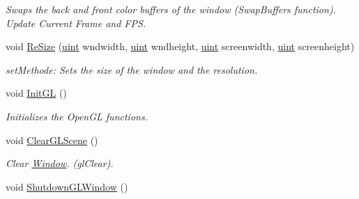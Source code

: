 \begin{DoxyCompactItemize}
\begin{DoxyCompactList}\small\item\em Swaps the back and front color buffers of the window (SwapBuffers function). Update Current Frame and FPS. \item\end{DoxyCompactList}\item 
void \hyperlink{class_f2_c_1_1_window_a018c40b68699cc3202cb6e29b2c22747}{ReSize} (\hyperlink{namespace_f2_c_a58be2bac9eb3e3c99cb41b6008bf4fae}{uint} wndwidth, \hyperlink{namespace_f2_c_a58be2bac9eb3e3c99cb41b6008bf4fae}{uint} wndheight, \hyperlink{namespace_f2_c_a58be2bac9eb3e3c99cb41b6008bf4fae}{uint} screenwidth, \hyperlink{namespace_f2_c_a58be2bac9eb3e3c99cb41b6008bf4fae}{uint} screenheight)
\begin{DoxyCompactList}\small\item\em setMethode: Sets the size of the window and the resolution. \item\end{DoxyCompactList}\item 
\hypertarget{class_f2_c_1_1_window_ab3c3289418b453e215486ed6fb611f5a}{
void \hyperlink{class_f2_c_1_1_window_ab3c3289418b453e215486ed6fb611f5a}{InitGL} ()}
\label{class_f2_c_1_1_window_ab3c3289418b453e215486ed6fb611f5a}

\begin{DoxyCompactList}\small\item\em Initializes the OpenGL functions. \item\end{DoxyCompactList}\item 
\hypertarget{class_f2_c_1_1_window_a0aefe1654782a8f3105ef6a46867e280}{
void \hyperlink{class_f2_c_1_1_window_a0aefe1654782a8f3105ef6a46867e280}{ClearGLScene} ()}
\label{class_f2_c_1_1_window_a0aefe1654782a8f3105ef6a46867e280}

\begin{DoxyCompactList}\small\item\em Clear \hyperlink{class_f2_c_1_1_window}{Window}. (glClear). \item\end{DoxyCompactList}\item 
\hypertarget{class_f2_c_1_1_window_a7d92448d55b3608df74ed6be97bdeef9}{
void \hyperlink{class_f2_c_1_1_window_a7d92448d55b3608df74ed6be97bdeef9}{ShutdownGLWindow} ()}
\label{class_f2_c_1_1_window_a7d92448d55b3608df74ed6be97bdeef9}


\end{DoxyCompactItemize}
